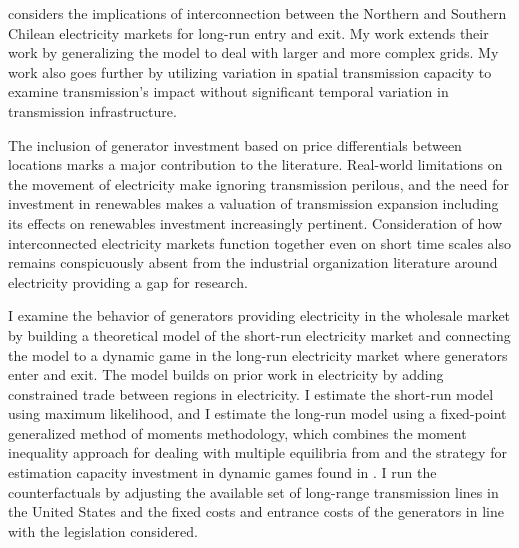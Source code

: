 \documentclass[12pt]{article}
\begin{document}
\cite{gonzales2022dynamic} considers the implications of interconnection between the Northern and Southern Chilean electricity markets for long-run entry and exit. My work extends their work by generalizing the model to deal with larger and more complex grids. My work also goes further by utilizing variation in spatial transmission capacity to examine transmission's impact without significant temporal variation in transmission infrastructure.

The inclusion of generator investment based on price differentials between locations marks a major contribution to the literature. Real-world limitations on the movement of electricity make ignoring transmission perilous, and the need for investment in renewables makes a valuation of transmission expansion including its effects on renewables investment increasingly pertinent. Consideration of how interconnected electricity markets function together even on short time scales also remains conspicuously absent from the industrial organization literature around electricity providing a gap for research. 

I examine the behavior of generators providing electricity in the wholesale market by building a theoretical model of the short-run electricity market and connecting the model to a dynamic game in the long-run electricity market where generators enter and exit. The model builds on prior work in electricity by adding constrained trade between regions in electricity. I estimate the short-run model using maximum likelihood, and I estimate the long-run model using a fixed-point generalized method of moments methodology, which combines the moment inequality approach for dealing with multiple equilibria from \cite{holmes2011diffusion} and the strategy for estimation capacity investment in dynamic games found in \cite{gowrisankaran2024computable}. I run the counterfactuals by adjusting the available set of long-range transmission lines in the United States and the fixed costs and entrance costs of the generators in line with the legislation considered.

\end{document}
